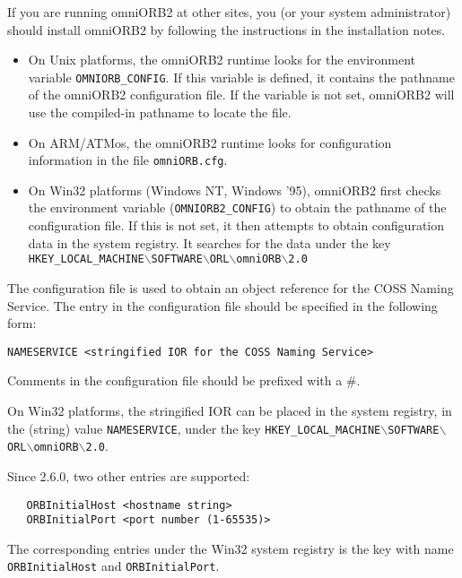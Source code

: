 \documentclass[11pt,twoside,onecolumn]{book}
\begin{document}
If you are running omniORB2 at other sites, you (or your system
administrator) should install omniORB2 by following the instructions in the
installation notes. 

\begin{itemize}

\item On Unix platforms, the omniORB2 runtime looks for the environment
variable {\tt OMNIORB\_CONFIG}. If this variable is defined, it contains
the pathname of the omniORB2 configuration file. If the variable is not
set, omniORB2 will use the compiled-in pathname to locate the file.

\item On ARM/ATMos, the omniORB2 runtime looks for configuration
information in the file {\tt omniORB.cfg}.

\item On Win32 platforms (Windows NT, Windows '95), omniORB2 first checks the 
environment variable ({\tt OMNIORB2\_CONFIG}) to obtain the pathname of the 
configuration file. If this is not set, it then attempts to obtain 
configuration data in the system registry. It searches for the data under 
the key {\tt HKEY\_LOCAL\_MACHINE$\backslash$SOFTWARE$\backslash$ORL$\backslash$omniORB$\backslash$2.0}

\end{itemize}

The configuration file is used to obtain an object reference for the
COSS Naming Service. The entry in the configuration file should be specified
in the following form:

{\tt NAMESERVICE <stringified IOR for the COSS Naming Service>}

Comments in the configuration file should be prefixed with a \#.

On Win32 platforms, the stringified IOR can be placed in the system registry, 
in the (string) value {\tt NAMESERVICE}, under the key 
{\tt HKEY\_LOCAL\_MACHINE$\backslash$SOFTWARE$\backslash$ORL$\backslash$omniORB$\backslash$2.0}.

Since 2.6.0, two other entries are supported:

\begin{verbatim}
   ORBInitialHost <hostname string>
   ORBInitialPort <port number (1-65535)>
\end{verbatim}

The corresponding entries under the Win32 system registry is the key with
name {\tt ORBInitialHost} and {\tt ORBInitialPort}.
\end{document}
